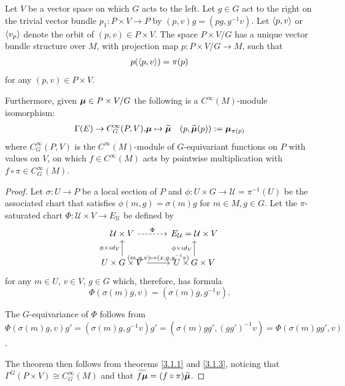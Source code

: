 
\begin{proposition} \label{propAssociatedExists}
    Let $V$ be a vector space on which $G$ acts to the left. Let $g \in G$ act to the right on the trivial vector bundle $p_1 :P \times V \to P$ by $(p, v)g = (pg, g^{-1}v)$. Let $\left\langle p, v \right\rangle$ or $\left\langle v_p \right\rangle$ denote the orbit of $(p, v) \in P \times V$. The space $P \times V/G$ has a unique vector bundle structure over $M$, with projection map $p: P \times V / G \to M$, such that \begin{align}
        p(\left\langle p, v \right\rangle) = \pi(p)
    \end{align} for any $(p, v) \in P \times V$.
    
    Furthermore, given $\bm{\mu} \in P \times V/G$ the following is a $C^\infty(M)$-module isomorphism: 
    \begin{align}\label{defnTilde}
        \Gamma(E) \to C^\infty_G(P, V), & \bm{\mu} \mapsto \widetilde{\bm{\mu}} & (p, \widetilde{\bm{\mu}}(p)) := \bm{\mu}_{\pi(p)}
    \end{align}
     where $C^\infty_G(P, V)$ is the $C^\infty(M)$-module of $G$-equivariant functions on $P$ with values on $V$, on which $f \in C^\infty(M)$ acts by pointwise multiplication with $f \circ \pi \in C^\infty_G(M)$. 
\end{proposition}

\begin{proof}
Let $\sigma: U \to P$ be a local section of $P$ and $\phi: U \times G \to \mathcal U = \pi^{-1}(U)$ be the associated chart that satisfies $\phi(m, g) = \sigma(m)g$ for $m \in M, g \in G$. Let the $\pi$-saturated chart $\Phi: \mathcal U \times V \to E_{\mathcal U}$ be defined by
\begin{equation*}
    \begin{tikzcd}
        \mathcal U \times V \arrow[dashed]{r}{\Phi} & E_{\mathcal U} = \mathcal U \times V \\
        U \times G \times V \arrow{u}{\phi \times id_V} \arrow{r}{(m, g, v) \mapsto (x, g, g^{-1}v)}    & U \times G \times V \arrow{u}{\phi \times id_V}
    \end{tikzcd}
\end{equation*}
for any $m \in U$, $v \in V$, $g \in G$ which, therefore, has formula
\[
    \Phi(\sigma(m)g, v) = (\sigma(m)g, g^{-1}v).
\]

The $G$-equivariance of $\Phi$ follows from $\Phi(\sigma(m)g, v)g' = (\sigma(m)g, g^{-1}v)g' = (\sigma(m)gg', (gg')^{-1}v) = \Phi(\sigma(m)gg', v)$.

The theorem then follows from theorems \ref{3.1.1} and \ref{3.1.3}, noticing that $\Gamma^G(P \times V) \cong C^\infty_G(M)$ and that $\widetilde{f \bm{\mu}} = (f \circ \pi) \widetilde{\bm{\mu}}$.
\end{proof}

